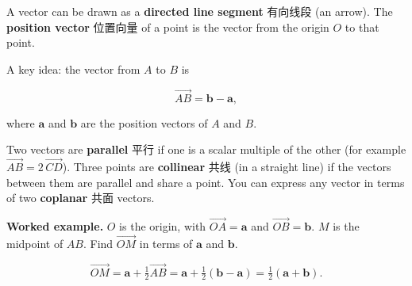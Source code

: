 \documentclass[11pt]{article}
\begin{document}
A vector can be drawn as a \textbf{directed line segment} 有向线段 (an arrow). The \textbf{position vector} 位置向量 of a point is the vector from the origin $O$ to that point.

A key idea: the vector from $A$ to $B$ is

\[
\overrightarrow{AB} = \mathbf{b} - \mathbf{a},
\]

where $\mathbf{a}$ and $\mathbf{b}$ are the position vectors of $A$ and $B$.

Two vectors are \textbf{parallel} 平行 if one is a scalar multiple of the other (for example $\overrightarrow{AB} = 2\,\overrightarrow{CD}$). Three points are \textbf{collinear} 共线 (in a straight line) if the vectors between them are parallel and share a point. You can express any vector in terms of two \textbf{coplanar} 共面 vectors.

\textbf{Worked example.} $O$ is the origin, with $\overrightarrow{OA} = \mathbf{a}$ and $\overrightarrow{OB} = \mathbf{b}$. $M$ is the midpoint of $AB$. Find $\overrightarrow{OM}$ in terms of $\mathbf{a}$ and $\mathbf{b}$.

\[
\overrightarrow{OM} = \mathbf{a} + \tfrac{1}{2}\overrightarrow{AB} = \mathbf{a} + \tfrac{1}{2}(\mathbf{b} - \mathbf{a}) = \tfrac{1}{2}(\mathbf{a} + \mathbf{b}).
\]
\end{document}
